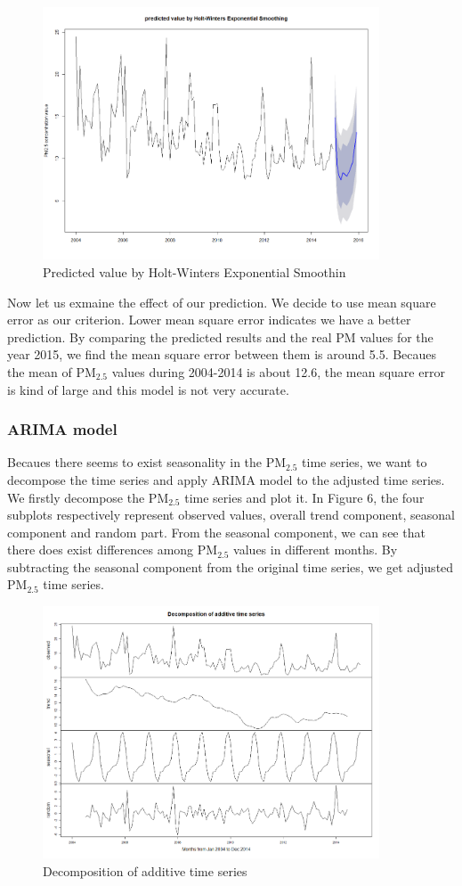 \documentclass[10pt]{article}
\begin{document}
\begin{figure}[H]
\centering
\includegraphics[width = 100mm]{ts3.png}
\caption{Predicted value by Holt-Winters Exponential Smoothin}
\end{figure}

Now let us exmaine the effect of our prediction. We decide to use mean square error as our criterion. Lower mean square error indicates we have a better prediction. By comparing the predicted results and the real PM values for the year 2015, we find the mean square error between them is around 5.5. Becaues the mean of PM$_{2.5}$ values during 2004-2014 is about 12.6, the mean square error is kind of large and this model is not very accurate.

\subsubsection{ARIMA model}
  Becaues there seems to exist seasonality in the PM$_{2.5}$ time series, we want to decompose the time series and apply ARIMA model to the adjusted time series. We firstly decompose the PM$_{2.5}$ time series and plot it. In Figure 6, the four subplots respectively represent observed values, overall trend component, seasonal component and random part. From the seasonal component, we can see that there does exist differences among PM$_{2.5}$ values in different months. By subtracting the seasonal component from the original time series, we get adjusted PM$_{2.5}$ time series.

\begin{figure}[H]
\centering
\includegraphics[width = 100mm]{ts4.png}
\caption{Decomposition of additive time series}
\end{figure}
\end{document}
